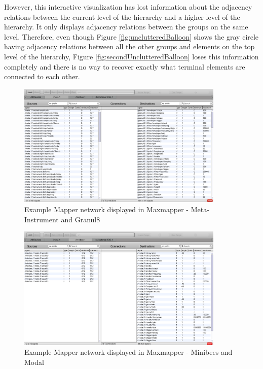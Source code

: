 However, this interactive visualization has lost information about the adjacency relations between the current level of the hierarchy and a higher level of the hierarchy. It only displays adjacency relations between the groups on the same level. Therefore, even though Figure \ref{fig:unclutteredBalloon} shows the gray circle having adjacency relations between all the other groups and elements on the top level of the hierarchy, Figure \ref{fig:secondUnclutteredBalloon} loses this information completely and there is no way to recover exactly what terminal elements are connected to each other.

\begin{figure}[p]
\centering
\includegraphics[width=0.88\textwidth]{maxmapperFirst.png}
\caption{Example Mapper network displayed in Maxmapper - Meta-Instrument and Granul8}
\label{fig:maxOne}
\end{figure}

\begin{figure}[p]
\centering
\includegraphics[width=0.88\textwidth]{maxmapperThree.png}
\caption{Example Mapper network displayed in Maxmapper - Minibees and Modal}
\label{fig:maxThree}
\end{figure}

